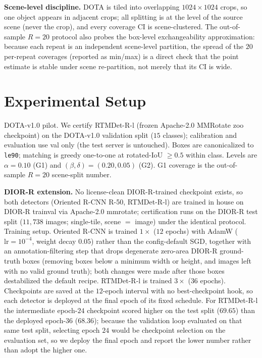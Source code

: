 \documentclass[journal]{IEEEtran}
\begin{document}
\textbf{Scene-level discipline.} DOTA is tiled into overlapping $1024\times1024$ crops, so one object appears
in adjacent crops; all splitting is at the level of the source scene (never the crop), and every
coverage CI is scene-clustered. The out-of-sample $R{=}20$ protocol also probes the box-level exchangeability
approximation: because each repeat is an independent scene-level partition, the spread of the $20$ per-repeat
coverages (reported as min/max) is a direct check that the point estimate is stable under scene re-partition,
not merely that its CI is wide.

\section{Experimental Setup}\label{sec:setup}
DOTA-v1.0 pilot. We certify RTMDet-R-l (frozen Apache-2.0 MMRotate \citep{zhou2022mmrotate} zoo checkpoint) on the DOTA-v1.0
\citep{xia2018dota} validation split ($15$ classes); calibration and evaluation use val only (the test server
is untouched). Boxes are canonicalized to \texttt{le90}; matching is greedy one-to-one at rotated-IoU $\ge
0.5$ within class. Levels are $\alpha=0.10$ (G1) and $(\beta,\delta)=(0.20,0.05)$ (G2). G1 coverage is the
out-of-sample $R{=}20$ scene-split number.

\textbf{DIOR-R extension.} No license-clean DIOR-R-trained checkpoint exists, so both detectors (Oriented
R-CNN R-50, RTMDet-R-l) are trained in house on DIOR-R \citep{cheng2022diorr} trainval via Apache-2.0
mmrotate; certification runs on the DIOR-R test split ($11{,}738$ images; single-tile, scene $=$ image) under
the identical protocol. Training setup. Oriented R-CNN is trained $1\times$ ($12$ epochs) with AdamW
($\mathrm{lr}=10^{-4}$, weight decay $0.05$) rather than the config-default SGD, together with an
 annotation-filtering step that drops degenerate zero-area DIOR-R ground-truth boxes
 (removing boxes below a minimum width or height, and images left with no valid ground truth); both changes were made after those boxes destabilized the
default recipe. RTMDet-R-l is trained $3\times$ ($36$ epochs). Checkpoints are saved at the $12$-epoch interval
with no best-checkpoint hook, so each detector is deployed at the final epoch of its fixed schedule.
For RTMDet-R-l the intermediate epoch-$24$ checkpoint scored higher on the test split ($69.65$) than the
deployed epoch-$36$ ($68.36$); because the validation loop evaluated on that same test split, selecting
epoch $24$ would be checkpoint selection on the evaluation set, so we deploy the final epoch and report the
lower number rather than adopt the higher one.
\end{document}
